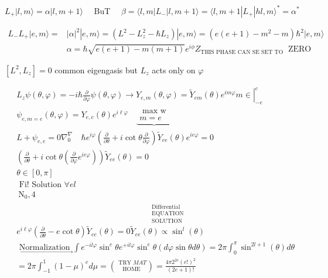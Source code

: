 $L_{+}|l, m\rangle=\alpha|l, m+1\rangle \quad$ BuT $\quad \beta=\langle l, m| L_{-}|l, m+1\rangle=\langle l, m+1| L_{+}|h l, m\rangle^{*}=\alpha^{*}$

$$
\begin{aligned}
L_{-} L_{+}|e, m\rangle= & |\alpha|^{2}|e, m\rangle=\left(L^{2}-L_{z}^{2}-\hbar L_{z}\right)|e, m\rangle=\left(e(e+1)-m^{2}-m\right) \hbar^{2}|e, m\rangle \\
& \alpha=\hbar \sqrt{e(e+1)-m(m+1)} e^{i \phi} Z_{\text {THIS PHASE CAN SE SET TO }} \text { ZERO }
\end{aligned}
$$

$\left[L^{2}, L_{z}\right]=0$ common eigengasis but $L_{z}$ acts only on $\varphi$

$$
\begin{aligned}
& L_{z} \psi(\theta, \varphi)=-i \hbar \frac{\partial}{\partial \varphi} \psi(\theta, \varphi) \rightarrow Y_{e, m}(\theta, \varphi)=\left.\tilde{Y}_{e m}(\theta) e^{i m \varphi} m \in\right|_{-e} ^{e} \\
& \psi_{e, m=e}(\theta, \varphi)=Y_{e, e}(\theta) e^{i \ell \varphi} \quad \underbrace{\substack{\text { max w } \\
m=e}} \\
& L+\psi_{e, e}=0 \nabla_{0}^{\nabla} \quad \hbar e^{i \varphi}\left(\frac{\partial}{\partial \theta}+i \cot \theta \frac{\partial}{\partial \varphi}\right) \widetilde{Y}_{e e}(\theta) e^{i e \varphi}=0 \\
& \left(\frac{\partial}{\partial \theta}+i \cot \theta\left(\frac{\partial}{\partial \varphi} e^{i e \varphi}\right)\right) \tilde{Y}_{e e}(\theta)=0 \\
& \theta \in[0, \pi] \\
& \text { Fi! Solution } \forall e l \\
& \mathrm{~N}_{0}, 4 \\
& e^{i \ell \varphi}\left(\frac{\partial}{\partial \theta}-e \cot \theta\right) \widetilde{Y}_{e e}(\theta)=0 \stackrel{\substack{\text { Differential } \\
\text { EQUATION } \\
\text { SOLUTION }}}{\tilde{Y}_{e e}(\theta) \propto \sin ^{l}(\theta)} \\
& \underset{\longrightarrow}{\text { Normalization }} \int e^{-i l \varphi} \sin ^{e} \theta e^{+i l \varphi} \sin ^{e} \theta(d \varphi \sin \theta d \theta)=2 \pi \int_{0}^{\pi} \sin ^{2l+1}(\theta) d \theta \\
& =2 \pi \int_{-1}^{1}(1-\mu)^{e} d \mu=\binom{\text { TRY } M A T}{\text { HOME }}=\frac{4 \pi 2^{2 e}(e!)^{2}}{(2 e+1)!} \\

\end{aligned}$$
